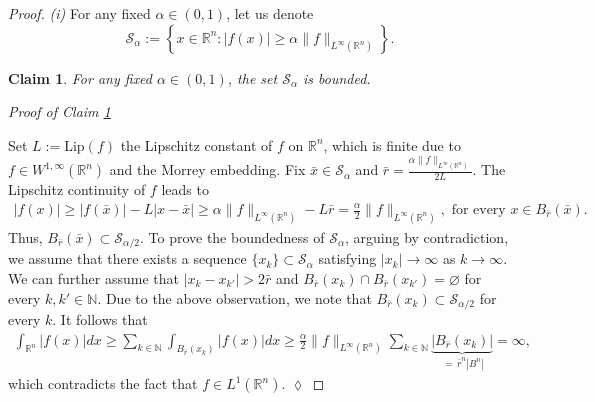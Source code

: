 \documentclass[11pt, reqno]{article}
\newtheorem{claim}[theorem]{Claim}
\theoremstyle{definition}
\numberwithin{equation}{section}
\newcommand{\R}{\mathbb{R}}
\newcommand{\Sset}{\mathscr S}
\begin{document}
\begin{proof}
    \textit{(i)} 
    For any fixed $\alpha \in (0, 1)$, let us denote    
    \[
        \Sset_\alpha := \left\{ x \in \R^n : |f(x)| \geq \alpha \| f \|_{L^\infty(\R^n)} \right\}.
    \]
    
    \begin{claim}\label{claim.W_alpha_bounded}
    		For any fixed $\alpha \in (0, 1)$, the set $\Sset_\alpha$ is bounded.
    \end{claim}
	    
    \medskip
    
    \textit{Proof of Claim \ref{claim.W_alpha_bounded}}
    
	\medskip
	
    Set $L := \mathrm{Lip}(f)$ the Lipschitz constant of $f$ on $\R^n$, which is finite due to $f \in W^{1, \infty}(\R^n)$ and the Morrey embedding.
    Fix $\bar x \in \Sset_\alpha$ and $\bar r = \frac{\alpha \| f \|_{L^\infty(\R^n)}}{2L}$.
   The Lipschitz continuity of $f$ leads to
   	\begin{align*}
   		|f(x)| \geq |f(\bar x)| - L |x - \bar x| \geq \alpha \| f \|_{L^\infty (\R^n)} - L \bar r = \frac{\alpha}{2} \| f \|_{L^\infty(\R^n)}, \text{ for every } x \in B_{\bar r}(\bar x).
   	\end{align*}
	Thus,  $B_{\bar r}(\bar x) \subset \Sset_{\alpha/2}$.
    To prove the boundedness of $\Sset_\alpha$, arguing by contradiction, we assume that there exists a sequence $\{ x_k \} \subset \Sset_\alpha$ satisfying $|x_k| \to \infty$ as $k \to \infty$.
    We can further assume that $|x_k - x_{k'}| > 2\bar r$ and $B_{\bar r}(x_k) \cap B_{\bar r}(x_{k'}) = \varnothing$ for every $k, k' \in \mathbb{N}$.
	Due to the above observation, we note that $B_{\bar r}(x_k) \subset \Sset_{\alpha/2}$ for every $k$.
	It follows that
	\begin{align*}
		\int_{\R^n} |f(x)| dx \geq \sum_{k \in \mathbb N} \int_{B_{\bar r}(x_k)} |f(x)| dx \geq \frac{\alpha}{2} \| f \|_{L^\infty(\R^n)} \sum_{k \in \mathbb N} \underbrace{|B_{\bar r}(x_k)|}_{ \, = \, \bar r^n |B^n|} = \infty,
	\end{align*}
	which contradicts the fact that $f \in L^1(\R^n)$. \hfill $\lozenge$	
	
	\medskip
	

\end{proof}
\end{document}
